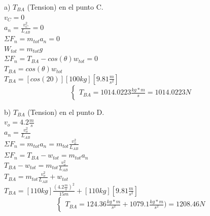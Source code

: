 \documentclass[a4paper,11pt]{scrartcl}
\begin{document}
\begin{center}
a) $T_{BA}$ (Tension) en el punto C.\\
\hfill \break
$v_C = 0$\\
\hfill \break
$a_n = \frac{v_C^2}{L_{AB}} = 0$\\
\hfill \break
$\Sigma F_n = m_{tot} a_n = 0$\\
\hfill \break
$W_{tot} = m_{tot} g$\\
\hfill \break
$\Sigma F_n = T_{BA} - cos(\theta)w_{tot} = 0$\\
\hfill \break
$T_{BA} = cos(\theta)w_{tot}$\\
\hfill \break
$T_{BA} = [cos(20)][100 kg][9.81 \frac{m}{s^2}]$\\

\begin{equation}
  \left\lbrace
  \begin{array}{l}
    T_{BA} = 1014.0223 \frac{kg*m}{s} = 1014.0223 N
  \end{array}
  \right.
\end{equation}

b) $T_{BA}$ (Tension) en el punto D.\\
\hfill \break
$v_o = 4.2 \frac{m}{s}$\\
\hfill \break
$a_n = \frac{v_o^2}{L_{AB}}$\\
\hfill \break
$\Sigma F_n = m_{tot} a_n = m_{tot} \frac{v_o^2}{L_{AB}}$\\
\hfill \break
$\Sigma F_n = T_{BA} - w_{tot} = m_{tot} a_n$\\
\hfill \break
$T_{BA} - w_{tot} = m_{tot} \frac{v_o^2}{L_{AB}}$\\
\hfill \break
$T_{BA} = m_{tot} \frac{v_o^2}{L_{AB}} + w_{tot}$\\
\hfill \break
$T_{BA} = [110 kg] \frac{(4.2 \frac{m}{s})^2}{15 m} + [110 kg][9.81 \frac{m}{s^2}]$\\

\begin{equation}
  \left\lbrace
  \begin{array}{l}
    T_{BA} = 124.36 \frac{kg*m}{s^2} + 1079.1 \frac{kg*m}{s^2}) = 1208.46 N
  \end{array}
  \right.
\end{equation}

\end{center}
\end{document}
